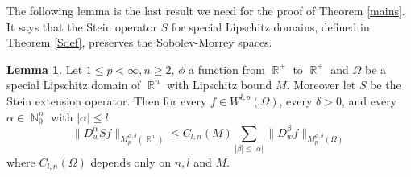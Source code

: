 \documentclass[12pt]{article}
\theoremstyle{definition}
\newtheorem{lemma}{Lemma}
\DeclareMathOperator\rr{\mathbb{R}}
\DeclareMathOperator\nn{\mathbb{N}}
\begin{document}
The following lemma is the last result we need for the proof of Theorem \ref{mains}. It says that the Stein operator $S$ for special Lipschitz domains, defined in Theorem \ref{Sdef}, preserves the Sobolev-Morrey spaces.


\begin{lemma}\label{speciallip}
Let $1\le p<\infty,n\ge2$, $\phi$ a function from $\rr^+$ to $\rr^+$ and $\Omega$ be a special Lipschitz domain of $\rr^n$ with Lipschitz bound $M.$ Moreover let $S$ be the Stein extension operator. Then for every $f \in W^{l,p}(\Omega)$, every $\delta>0$, and every $\alpha \in \nn_0^n$ with $|\alpha|\le l$ 
\begin{equation}
 \| D^\alpha_w Sf\|_{M_p^{\phi,\delta}(\rr^n)}\le C_{l,n}(M)\sum_{|\beta|\le |\alpha|}\|D^\beta_w f \|_{M_p^{\phi,\delta}(\Omega)} \label{Sbound}
 \end{equation}
 where $C_{l,n}(\Omega)$ depends only on $n,l$ and $M.$
\end{lemma}
\end{document}
